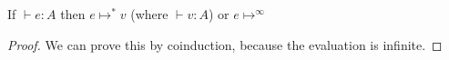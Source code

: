 \vspace{1cm}

\begin{thm}
If $\vdash e : A$ then $e \mapsto^* v$ (where $\vdash v : A$) or $e \mapsto^{\infty}$
\end{thm}

\begin{proof} 
We can prove this by coinduction, because the evaluation is infinite. 







\end{proof}